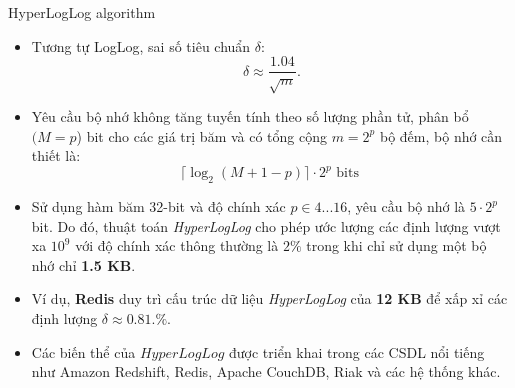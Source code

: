 \documentclass[10pt]{beamer}
\begin{document}
\begin{frame}{HyperLogLog algorithm}
\begin{itemize}
	\item Tương tự LogLog, sai số tiêu chuẩn $\delta$: \[\delta \approx \frac{1.04}{\sqrt{m}}.\]
	\item Yêu cầu bộ nhớ không tăng tuyến tính theo số lượng phần tử, phân bổ $(M=p$) bit cho các giá trị băm và có tổng cộng $m = 2^p$ bộ đếm, bộ nhớ cần thiết là:
  \[\lceil\log_2\left(M + 1 - p\right)\rceil\cdot2^p \text{ bits }\]
  \item Sử dụng hàm băm 32-bit và độ chính xác $p \in 4...16$, yêu cầu bộ nhớ là $5\cdot 2^p$ bit. Do đó, thuật toán \textit{HyperLogLog} cho phép ước lượng các định lượng vượt xa $10^9$ với độ chính xác thông thường là $2\%$ trong khi chỉ sử dụng một bộ nhớ chỉ \textbf{1.5 KB}.
  \item Ví dụ, \textbf{Redis} duy trì cấu trúc dữ liệu \textit{HyperLogLog} của \textbf{12 KB} để xấp xỉ các định lượng $\delta \approx 0.81.\%$.
  \item Các biến thể của $HyperLogLog$ được triển khai trong các CSDL nổi tiếng như Amazon Redshift, Redis, Apache CouchDB, Riak 
  và các hệ thống khác.
\end{itemize}
\end{frame}
\end{document}
